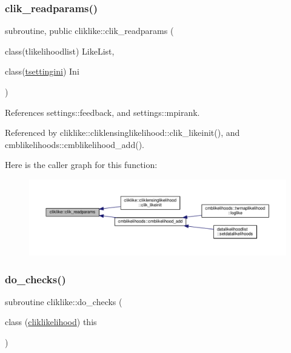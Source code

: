 \subsubsection{\texorpdfstring{clik\+\_\+readparams()}{clik\_readparams()}}
{\footnotesize\ttfamily subroutine, public cliklike\+::clik\+\_\+readparams (\begin{DoxyParamCaption}\item[{class(tlikelihoodlist)}]{Like\+List,  }\item[{class(\mbox{\hyperlink{structsettings_1_1tsettingini}{tsettingini}})}]{Ini }\end{DoxyParamCaption})}



References settings\+::feedback, and settings\+::mpirank.



Referenced by cliklike\+::cliklensinglikelihood\+::clik\+\_\+likeinit(), and cmblikelihoods\+::cmblikelihood\+\_\+add().

Here is the caller graph for this function\+:
\nopagebreak
\begin{figure}[H]
\begin{center}
\leavevmode
\includegraphics[width=350pt]{namespacecliklike_afd6ed043a70bb783b9840d5569cb85bb_icgraph}
\end{center}
\end{figure}
\mbox{\label{namespacecliklike_ab304afaa9dfed7a5bfa3d0827bce1b4d}} 
\subsubsection{\texorpdfstring{do\+\_\+checks()}{do\_checks()}}
{\footnotesize\ttfamily subroutine cliklike\+::do\+\_\+checks (\begin{DoxyParamCaption}\item[{class (\mbox{\hyperlink{structcliklike_1_1cliklikelihood}{cliklikelihood}})}]{this }\end{DoxyParamCaption})\hspace{0.3cm}{\ttfamily [private]}}



